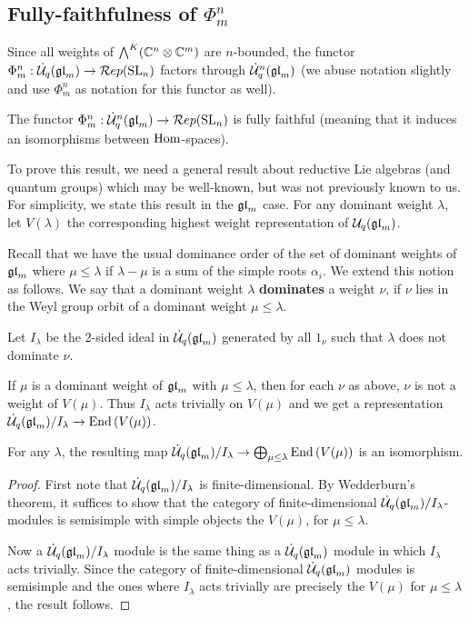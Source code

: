 \documentclass[10pt,leqno]{article}
\begin{document}
\subsection{Fully-faithfulness of $ \Phi_m^n$}

Since all weights of $\bigwedge^K(\mathbb{C}^n \otimes \mathbb{C}^m)$ are $ n$-bounded, the functor $\Phi_m^n: \dot{{\mathcal{U}}}_q({\mathfrak{gl}}_m)\rightarrow \mathcal{R}ep({\rm{SL}}_n)$ factors through $\dot{{\mathcal{U}}}_q^n({\mathfrak{gl}}_m)$ (we abuse notation slightly and use $\Phi_m^n$ as notation for this functor as well).

\begin{thm}\label{th:functorfullyfaithful}
The functor $\Phi_m^n: \dot{{\mathcal{U}}}_q^n({\mathfrak{gl}}_m) \rightarrow \mathcal{R}ep({\rm{SL}}_n)$ is fully faithful (meaning that it induces an isomorphisms between $\operatorname{Hom}$-spaces).
\end{thm}

To prove this result, we need a general result about reductive Lie algebras (and quantum groups) which may be well-known, but was not previously known to us.   For simplicity, we state this result in the $ {\mathfrak{gl}}_m $ case.  For any dominant weight $ \lambda $, let $V(\lambda)$ the corresponding highest weight representation of $ \mathcal{U}_q({\mathfrak{gl}}_m)$.

Recall that we have the usual dominance order of the set of dominant weights of $ {\mathfrak{gl}}_m $ where $ \mu \le \lambda $ if $ \lambda - \mu $ is a sum of the simple roots $ \alpha_i $.  We extend this notion as follows.  We say that a dominant weight $ \lambda $ \textbf{dominates} a weight $ \nu $, if $ \nu $ lies in the Weyl group orbit of a dominant weight $ \mu \le \lambda $.

Let $ I_\lambda $ be the 2-sided ideal in $\dot{{\mathcal{U}}}_q({\mathfrak{gl}}_m)$ generated by all $ 1_\nu $ such that $ \lambda $ does not dominate $ \nu $.

If $ \mu $ is a dominant weight of $ {\mathfrak{gl}}_m $ with $ \mu \le \lambda $, then for each $ \nu $ as above, $ \nu $ is not a weight of $V(\mu)$.  Thus $ I_\lambda $ acts trivially on $ V(\mu) $ and we get a representation $ \dot{{\mathcal{U}}}_q({\mathfrak{gl}}_m) / I_\lambda \rightarrow \operatorname{End}\left(V(\mu)\right) $.

\begin{lem}
For any $ \lambda $, the resulting map $ \dot{{\mathcal{U}}}_q({\mathfrak{gl}}_m) / I_\lambda \rightarrow \bigoplus_{\mu \le \lambda} \operatorname{End}\left(V(\mu)\right)$ is an isomorphism.
\end{lem}
\begin{proof}
First note that $\dot{{\mathcal{U}}}_q({\mathfrak{gl}}_m)/ I_\lambda $ is finite-dimensional.  By Wedderburn's theorem, it suffices to show that the category of finite-dimensional $\dot{{\mathcal{U}}}_q({\mathfrak{gl}}_m)/I_\lambda$-modules is semisimple with simple objects the $V(\mu)$, for $\mu \le \lambda$.

Now a $\dot{{\mathcal{U}}}_q({\mathfrak{gl}}_m)/I_\lambda$ module is the same thing as a $\dot{{\mathcal{U}}}_q({\mathfrak{gl}}_m) $ module in which $ I_\lambda $ acts trivially.  Since the category of finite-dimensional $ \dot{{\mathcal{U}}}_q({\mathfrak{gl}}_m) $ modules is semisimple and the ones where $ I_\lambda $ acts trivially are precisely the $ V(\mu) $ for $ \mu \le \lambda$, the result follows.
\end{proof}
\end{document}
